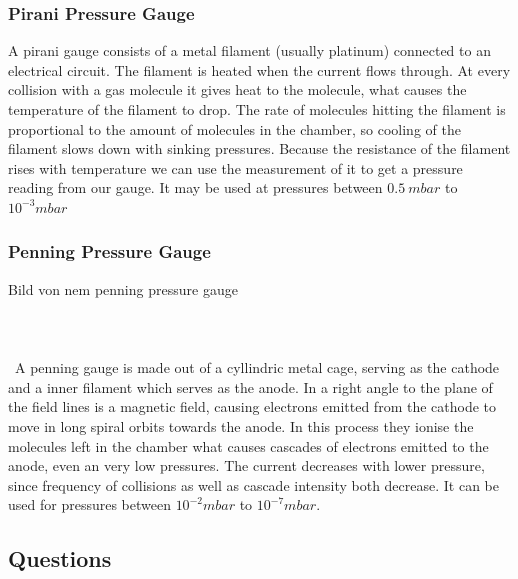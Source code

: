 \documentclass[]{article}
\begin{document}
\subsubsection[Pirani]{Pirani Pressure Gauge}
A pirani gauge consists of a metal filament (usually platinum) connected to an electrical circuit. The filament is heated when the current flows through. At every collision with a gas molecule it gives heat to the molecule, what causes the temperature of the filament to drop. The rate of molecules hitting the filament is proportional to the amount of molecules in the chamber, so cooling of the filament slows down with sinking pressures. Because the resistance of the filament rises with temperature we can use the measurement of it to get a pressure reading from our gauge. It may be used at pressures between $0.5\ mbar$ to $10^{-3}mbar$
\subsubsection[Penning]{Penning Pressure Gauge}
Bild von nem penning pressure gauge
\\\\\\\\\
A penning gauge is made out of a cyllindric metal cage, serving as the cathode and a inner filament which serves as the anode. In a right angle to the plane of the field lines is a magnetic field, causing electrons emitted from the cathode to move in long spiral orbits towards the anode. In this process they ionise the molecules left in the chamber what causes cascades of electrons emitted to the anode, even an very low pressures. The current decreases with lower pressure, since frequency of collisions as well as cascade intensity both decrease. It can be used for pressures between $10^{-2}mbar$ to $10^{-7}mbar$.

\subsection{Questions}
\end{document}
